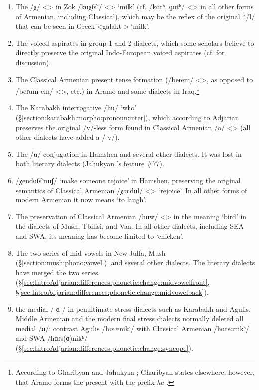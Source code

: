 \documentclass[output=paper]{langscibook}
\begin{document}
\begin{enumerate}
\item 	The  /χ/ <> in Zok /kɑχt͡sʰ/ <>  `milk' (cf.  /kɑtʰ, ɡɑtʰ/ <>  in all other forms of Armenian, including Classical), which may be the reflex of the original */l/ that can be seen in Greek <galakt-> `milk'.
\item 	The voiced aspirates in group 1 and 2 dialects, which some scholars believe to directly preserve the original Indo-European voiced aspirates (cf. \citealt{Garrett-1991-IndoEuropeanReconstructionHistoricalMethodologiesa} for discussion).
\item The Classical Armenian present tense formation (/beɾem/ <>, as opposed to /beɾum em/ <>, etc.) in Aramo and some dialects in Iraq.\footnote{According to Gharibyan \citep{Gharibyan-1962-AgainArmenianConsonants}  and Jahukyan \citep{Jahukyan-1972-ArmenianDiaolectology}; Gharibyan states elsewhere, however,   that Aramo forms the present with the prefix \textit{ha} \citep{Gharibyan-1958-SyriaArmenianNewDiscovered}. } 
\item 	The Karabakh interrogative /hu/ `who' (\S\ref{section:karabakh:morpho:pronoun:inter}), which according to Adjarian preserves the original /v/-less form found in Classical Armenian /o/ <> (all other dialects have added a /-v/).
\item 	The /u/-conjugation in Hamshen and several other dialects. It was lost in both literary dialects  (Jahukyan \citeyear{Jahukyan-1972-ArmenianDiaolectology}'s feature \#77).
\item /χendɑt͡sʰnuʃ/ `make someone rejoice' in Hamshen, preserving the original semantics of Classical Armenian /χəndɑl/ <> `rejoice'. In all other forms of modern Armenian it now means `to laugh'.
\item The preservation of Classical Armenian /hɑw/ <>  in the meaning `bird' in the dialects of Mush, Tbilisi, and Van. In all other dialects, including SEA and SWA, its meaning has become limited to `chicken'.
\item The two series of mid vowels in New Julfa, Mush (\S\ref{section:mush:phono:vowel}), and several other dialects. The literary dialects have merged the two series (\S\ref{sec:IntroAdjarian:differences:phonetic:change:midvowelfront}, \S\ref{sec:IntroAdjarian:differences:phonetic:change:midvowelback}).
\item the medial /-ɑ-/ in penultimate stress dialects such as Karabakh and Agulis.  Middle Armenian and the modern final stress dialects normally deleted all medial /ɑ/; contrast Agulis /hɾsænikʰ/ with Classical Armenian /hɑrsɑnikʰ/ and SWA /hɑɾs(ɑ)nikʰ/ (\S\ref{sec:IntroAdjarian:differences:phonetic:change:syncope}). 

\end{enumerate}
\end{document}
